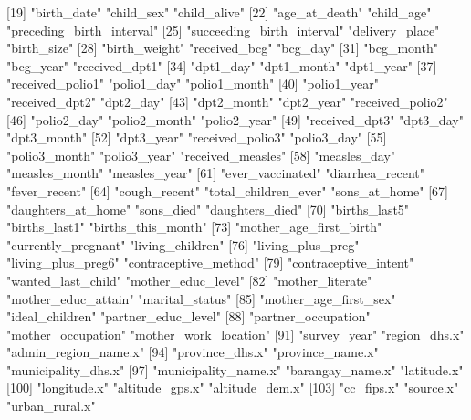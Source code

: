  [19] "birth_date"                "child_sex"                 "child_alive"              
 [22] "age_at_death"              "child_age"                 "preceding_birth_interval" 
 [25] "succeeding_birth_interval" "delivery_place"            "birth_size"               
 [28] "birth_weight"              "received_bcg"              "bcg_day"                  
 [31] "bcg_month"                 "bcg_year"                  "received_dpt1"            
 [34] "dpt1_day"                  "dpt1_month"                "dpt1_year"                
 [37] "received_polio1"           "polio1_day"                "polio1_month"             
 [40] "polio1_year"               "received_dpt2"             "dpt2_day"                 
 [43] "dpt2_month"                "dpt2_year"                 "received_polio2"          
 [46] "polio2_day"                "polio2_month"              "polio2_year"              
 [49] "received_dpt3"             "dpt3_day"                  "dpt3_month"               
 [52] "dpt3_year"                 "received_polio3"           "polio3_day"               
 [55] "polio3_month"              "polio3_year"               "received_measles"         
 [58] "measles_day"               "measles_month"             "measles_year"             
 [61] "ever_vaccinated"           "diarrhea_recent"           "fever_recent"             
 [64] "cough_recent"              "total_children_ever"       "sons_at_home"             
 [67] "daughters_at_home"         "sons_died"                 "daughters_died"           
 [70] "births_last5"              "births_last1"              "births_this_month"        
 [73] "mother_age_first_birth"    "currently_pregnant"        "living_children"          
 [76] "living_plus_preg"          "living_plus_preg6"         "contraceptive_method"     
 [79] "contraceptive_intent"      "wanted_last_child"         "mother_educ_level"        
 [82] "mother_literate"           "mother_educ_attain"        "marital_status"           
 [85] "mother_age_first_sex"      "ideal_children"            "partner_educ_level"       
 [88] "partner_occupation"        "mother_occupation"         "mother_work_location"     
 [91] "survey_year"               "region_dhs.x"              "admin_region_name.x"      
 [94] "province_dhs.x"            "province_name.x"           "municipality_dhs.x"       
 [97] "municipality_name.x"       "barangay_name.x"           "latitude.x"               
[100] "longitude.x"               "altitude_gps.x"            "altitude_dem.x"           
[103] "cc_fips.x"                 "source.x"                  "urban_rural.x"            
